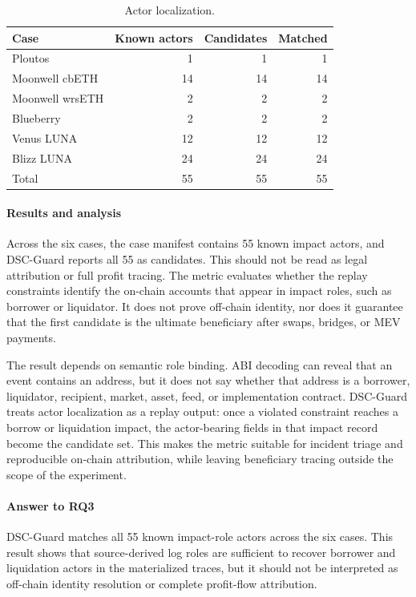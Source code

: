 \documentclass[final,5p]{elsarticle}
\newcommand{\tool}{DSC-Guard\xspace}
\begin{document}
\begin{table}[t]
\centering
\caption{Actor localization.}
\label{tab:actors}
\small
\begin{tabular}{lrrr}
\toprule
Case & Known actors & Candidates & Matched \\
\midrule
Ploutos & 1 & 1 & 1 \\
Moonwell cbETH & 14 & 14 & 14 \\
Moonwell wrsETH & 2 & 2 & 2 \\
Blueberry & 2 & 2 & 2 \\
Venus LUNA & 12 & 12 & 12 \\
Blizz LUNA & 24 & 24 & 24 \\
\midrule
Total & 55 & 55 & 55 \\
\bottomrule
\end{tabular}
\end{table}

\paragraph{Results and analysis}
Across the six cases, the case manifest contains 55 known impact actors, and \tool reports all 55 as candidates.
This should not be read as legal attribution or full profit tracing.
The metric evaluates whether the replay constraints identify the on-chain accounts that appear in impact roles, such as borrower or liquidator.
It does not prove off-chain identity, nor does it guarantee that the first candidate is the ultimate beneficiary after swaps, bridges, or MEV payments.

The result depends on semantic role binding.
ABI decoding can reveal that an event contains an address, but it does not say whether that address is a borrower, liquidator, recipient, market, asset, feed, or implementation contract.
\tool treats actor localization as a replay output: once a violated constraint reaches a borrow or liquidation impact, the actor-bearing fields in that impact record become the candidate set.
This makes the metric suitable for incident triage and reproducible on-chain attribution, while leaving beneficiary tracing outside the scope of the experiment.

\paragraph{Answer to RQ3}
\tool matches all 55 known impact-role actors across the six cases.
This result shows that source-derived log roles are sufficient to recover borrower and liquidation actors in the materialized traces, but it should not be interpreted as off-chain identity resolution or complete profit-flow attribution.
\end{document}
